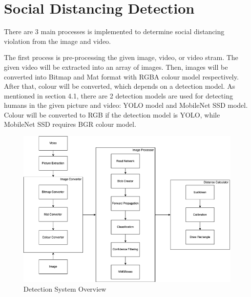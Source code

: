     \section{Social Distancing Detection}
        There are 3 main processes is implemented to determine social distancing violation from the image and video.

        The first process is pre-processing the given image, video, or video stram.
        The given video will be extracted into an array of images.
        Then, images will be converted into Bitmap and Mat format with RGBA colour model respectively.
        After that, colour will be converted, which depends on a detection model.
        As mentioned in section 4.1, there are 2 detection models are used for detecting humans in the given picture and video: YOLO model and MobileNet SSD model.
        Colour will be converted to RGB if the detection model is YOLO,
        while MobileNet SSD requires BGR colour model.

        \begin{figure}[!ht]
            \centering
            \includegraphics[width=5in]{images/chapter3/system-overview.png}
            \caption{Detection System Overview}
            \label{systemOverview}
        \end{figure}

